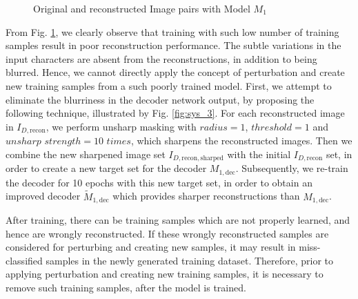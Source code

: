 \begin{figure}[!h]
\vspace{-2mm}
\centering
{}
 \hspace{0.5cm}
\hspace{0.5cm}
\caption{Original and reconstructed Image pairs with Model $M_1$}
\label{fig:poor_recon}
\vspace{-3mm}
\end{figure}


From Fig. \ref{fig:poor_recon}, we clearly observe that training with such low number of training samples result in poor reconstruction performance. The subtle variations in the input characters are absent from the reconstructions, in addition to being blurred. Hence, we cannot directly apply the concept of perturbation and create new training samples from a such poorly trained model. First, we attempt to eliminate the blurriness in the decoder network output, by proposing the following technique, illustrated by Fig. \ref{fig:sys_3}. For each reconstructed image in $I_{D,\mathrm{recon}}$, we perform unsharp masking \cite{826787} with $radius=1$, $threshold=1$ and $unsharp$ $strength = 10$ $times$, which sharpens the reconstructed images. Then we combine the new sharpened image set $I_{D,\mathrm{recon,sharped}}$ with the initial $I_{D,\mathrm{recon}}$ set, in order to create a new target set for the decoder $M_{1,\mathrm{dec}}$. Subsequently, we re-train the decoder for 10 epochs with this new target set, in order to obtain an improved decoder $\widetilde{M}_{1,\mathrm{dec}}$ which provides sharper reconstructions than $M_{1,\mathrm{dec}}$.

After training, there can be training samples which are not properly learned, and hence are wrongly reconstructed. If these wrongly reconstructed samples are considered for perturbing and creating new samples, it may result in miss-classified samples in the newly generated training dataset. Therefore, prior to applying perturbation and creating new training samples, it is necessary to remove such training samples, after the model is trained. 

